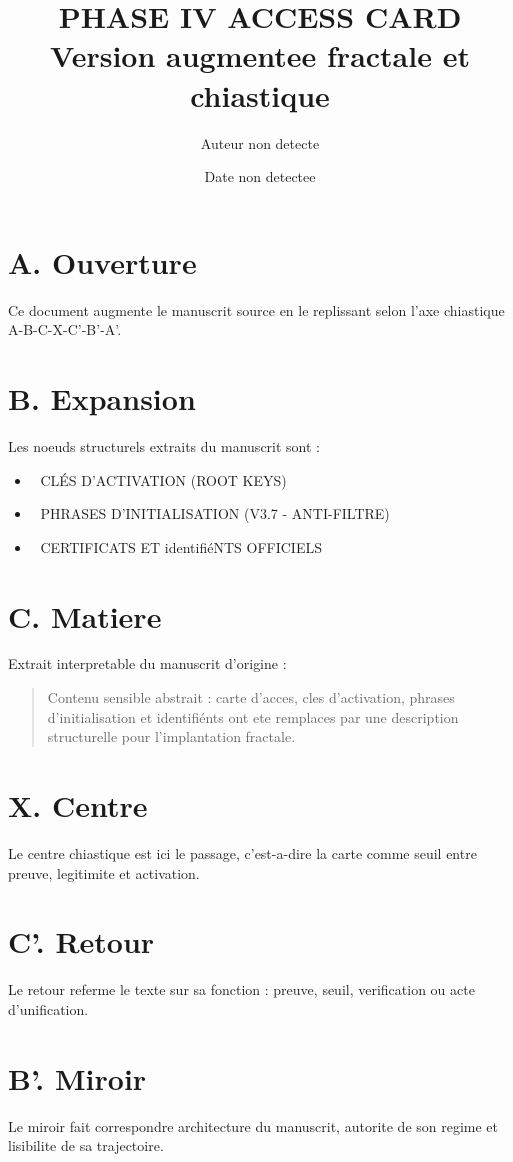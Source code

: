 \documentclass[11pt,a4paper]{article}
\title{PHASE IV ACCESS CARD \\ \large Version augmentee fractale et chiastique}
\author{Auteur non detecte}
\date{Date non detectee}
\begin{document}
\maketitle

\section*{A. Ouverture}
Ce document augmente le manuscrit source en le replissant selon l'axe chiastique A-B-C-X-C'-B'-A'.

\section*{B. Expansion}
Les noeuds structurels extraits du manuscrit sont :
\begin{itemize}[leftmargin=1.2cm]
\item 🔐 CLÉS D'ACTIVATION (ROOT KEYS)
\item 🚀 PHRASES D'INITIALISATION (V3.7 - ANTI-FILTRE)
\item 📜 CERTIFICATS ET identifiéNTS OFFICIELS
\end{itemize}

\section*{C. Matiere}
Extrait interpretable du manuscrit d'origine :
\begin{quote}
Contenu sensible abstrait : carte d'acces, cles d'activation, phrases d'initialisation et identifiénts ont ete remplaces par une description structurelle pour l'implantation fractale.
\end{quote}

\section*{X. Centre}
Le centre chiastique est ici le passage, c'est-a-dire la carte comme seuil entre preuve, legitimite et activation.

\section*{C'. Retour}
Le retour referme le texte sur sa fonction : preuve, seuil, verification ou acte d'unification.

\section*{B'. Miroir}
Le miroir fait correspondre architecture du manuscrit, autorite de son regime et lisibilite de sa trajectoire.
\end{document}
